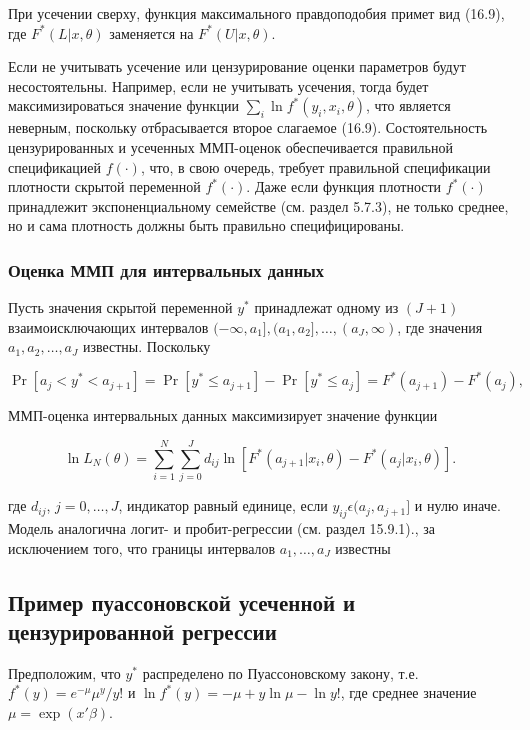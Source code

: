 При усечении сверху, функция максимального правдоподобия примет вид (16.9), где $F^{*}(L|x,\theta)$ заменяется на $F^{*}(U|x,\theta)$.


Если не учитывать усечение или цензурирование оценки параметров будут несостоятельны. Например, если не учитывать усечения, тогда будет максимизироваться значение функции $\sum_{i} \ln{  f^{*}(y_i,x_i,\theta)}$, что является неверным, поскольку отбрасывается второе слагаемое (16.9). Состоятельность цензурированных и усеченных ММП-оценок обеспечивается правильной спецификацией $f(\cdot )$, что, в свою очередь, требует правильной спецификации плотности скрытой переменной $f^{*}(\cdot )$. Даже если функция плотности $f^{*}(\cdot )$ принадлежит экспоненциальному семействе (см. раздел 5.7.3), не только среднее, но и сама плотность должны быть правильно специфицированы.


\subsubsection*{Оценка ММП для интервальных данных}


Пусть значения скрытой переменной $y^* $ принадлежат одному из $(J+1)$ взаимоисключающих интервалов $(-\infty,a_1], (a_1,a_2],\ldots ,(a_J,\infty)$, где значения $a_1,a_2,\ldots ,a_J$ известны. Поскольку

\[
\Pr[ a_j<y^* <a_{j+1}]=\Pr[ y^*  \leq a_{j+1}]-\Pr[ y^*  \leq a_j] =
F^{*}(a_{j+1})-F^{*}(a_j),
\]

ММП-оценка интервальных данных максимизирует значение функции 

\begin{equation}
\ln{ L_N(\theta)}=\sum_{i=1}^N\sum_{j=0}^J d_{ij} \ln[F^{*}(a_{j+1}|x_i,\theta)-F^{*}(a_j|x_i,\theta)].
\end{equation}


где $d_{ij}$, $j=0,\ldots ,J$, индикатор равный единице, если $y_{ij}{\epsilon}(a_j,a_{j+1}]$ и нулю иначе. Модель аналогична логит- и пробит-регрессии (см. раздел 15.9.1)., за исключением того, что границы интервалов $a_1,\ldots ,a_J$ известны


\subsection{Пример пуассоновской усеченной и цензурированной регрессии}


Предположим, что $y^* $ распределено по Пуассоновскому закону, т.е. $f^{*}(y)=e^{-\mu}\mu^{y}/y!$ и $\ln{ f^{*}(y)}=-\mu+y\ln{ \mu}-\ln{ y!}$, где среднее значение $\mu=\exp (x'\beta)$.

